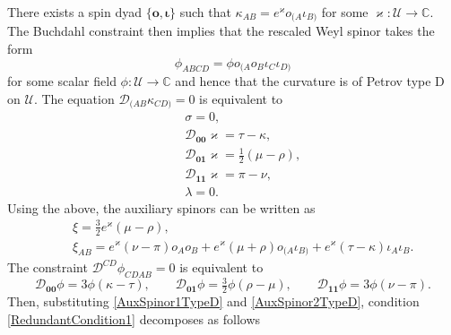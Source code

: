 \documentclass[10pt,a4paper]{article}
\newcommand\omicron{o}
\theoremstyle{plain}
\begin{document}
There exists a spin dyad $\lbrace \bm\omicron, \bm\iota\rbrace$ such that $\kappa_{AB} = e^{\varkappa} \omicron_{(A}\iota_{B)}$ for some $\varkappa:\mathcal{U}\rightarrow\mathbb{C}$. The Buchdahl constraint then implies that the rescaled Weyl spinor takes the form
\[ \phi_{ABCD}= \phi \omicron_{(A}\omicron_B\iota_C\iota_{D)}\]
for some scalar field $\phi:\mathcal{U}\rightarrow\mathbb{C}$ and hence that the curvature is of Petrov type D on $\mathcal{U}$. The equation $\mathcal{D}_{(AB}\kappa_{CD)}=0$ is equivalent to 
\begin{subequations}
\begin{eqnarray}
&& \sigma=0,\label{SpatialSenTypeD0000}\\
&& \mathcal{D}_{\bm0\bm0}\varkappa = \tau - \kappa, \label{SpatialSenTypeD0001}\\
&& \mathcal{D}_{\bm0\bm1}\varkappa = \tfrac{1}{2} (\mu-\rho),\label{SpatialSenTypeD0011}\\
&& \mathcal{D}_{\bm1\bm1}\varkappa = \pi - \nu, \label{SpatialSenTypeD0111}\\
&& \lambda = 0.\label{SpatialSenTypeD1111}
\end{eqnarray}
\end{subequations}
Using the above, the auxiliary spinors can be written as 
\begin{subequations}
\begin{eqnarray} 
&& \xi =\tfrac{3}{2}e^{\varkappa}(\mu -  \rho), \label{AuxSpinor1TypeD}\\
&& \xi_{AB} = e^{\varkappa} (\nu - \pi) o_{A} o_{B} + e^{\varkappa}(\mu + \rho) o_{(A}\iota_{B)} + e^{\varkappa} (\tau - \kappa) \iota_{A} \iota_{B}. \label{AuxSpinor2TypeD}
\end{eqnarray}
\end{subequations}
The constraint $\mathcal{D}^{CD}\phi_{CDAB}=0$ is equivalent to 
\begin{equation}\label{WeylConstraintTypeD}
  \mathcal{D}_{\bm0\bm0}\phi = 3 \phi(\kappa - \tau), \qquad 
  \mathcal{D}_{\bm0\bm1}\phi = \tfrac{3}{2}\phi(\rho -\mu), \qquad
  \mathcal{D}_{\bm1\bm1}\phi = 3\phi (\nu  - \pi). 
\end{equation}
Then, substituting \eqref{AuxSpinor1TypeD} and \eqref{AuxSpinor2TypeD}, condition \eqref{RedundantCondition1} decomposes as follows
\end{document}
